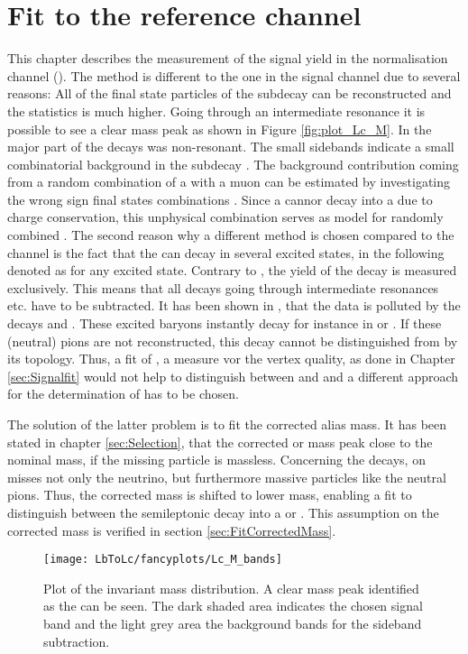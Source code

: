 \chapter{Fit to the reference channel \LbToLcmunu}
\label{sec:Normalisationfit}
This chapter describes the measurement of the signal yield \NLc in the normalisation channel \LbToLcmunu (\LcTopKpi). 
The method is different to the one in the signal channel \LbToDpmunuX due to several reasons:
All of the final state particles of the subdecay \LcTopKpi can be reconstructed and the statistics is much higher. 
Going through an intermediate resonance it is possible to see a clear \Lc mass peak as shown in Figure \ref{fig:plot_Lc_M}.
In \LbToDpmunuX the major part of the decays was non-resonant.
The small sidebands indicate a small combinatorial background in the subdecay \LcTopKpi.
The background contribution coming from a random combination of a \Lc with a muon can be estimated by investigating the wrong sign final states combinations \Lc\mup.
Since a \Lb cannor decay into a \Lc\mup due to charge conservation, this unphysical combination serves as model for randomly combined \Lc\mun.
The second reason why a different method is chosen compared to the \LbToDpmunuX channel is the fact that the \Lb can decay in several excited \Lc states, in the following denoted as \Lcstar for any excited \Lc state.
Contrary to \LbToDpmunuX, the yield of the decay \LbToLcmunu is measured exclusively.
This means that all decays going through intermediate resonances etc. have to be subtracted.
It has been shown in \cite{SL_Vub}, that the \LbToLcmunu data is polluted by the decays  and .
These excited \Lcstar baryons instantly decay for instance in \Lc\pip\pim or \Lc\piz. 
If these (neutral) pions are not reconstructed, this decay cannot be distinguished from \LbToLcmunu by its topology.
Thus, a fit of \logIP, a measure vor the vertex quality, as done in Chapter \ref{sec:Signalfit} would not help to distinguish between \LbToLcmunu and \decay{\Lb}{\Lcstar\mun\neumb} and a different approach for the determination of \NLc has to be chosen.

The solution of the latter problem is to fit the corrected \pKpi\mun alias \Lb mass.
It has been stated in chapter \ref{sec:Selection}, that the corrected \pKpi\mun or \Lb mass peak close to the nominal \Lb mass, if the missing particle is massless.
Concerning the \decay{\Lb}{\Lcstar\mun\neumb} decays, on misses not only the neutrino, but furthermore massive particles like the neutral pions.
Thus, the corrected \Lb mass is shifted to lower mass, enabling a fit to distinguish between the semileptonic \Lb decay into a \Lc or \Lcstar.
This assumption on the corrected mass is verified in section \ref{sec:FitCorrectedMass}.
\begin{figure}[ptb]
    \centering
	\texttt{[image: LbToLc/fancyplots/Lc\_M\_bands]}	
	\caption{Plot of the invariant \pKpi mass distribution. A clear mass peak identified as the \Lc can be seen. The dark shaded area indicates the chosen signal band and the light grey area the background bands for the sideband subtraction.}
	\label{fig:plot_Lc_M_bands}
\end{figure}

